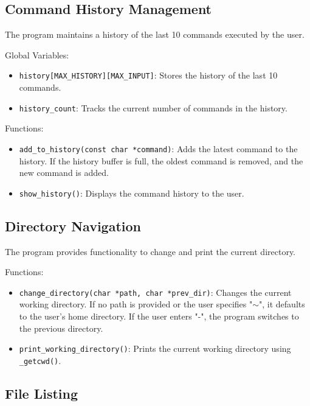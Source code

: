 \documentclass{article}
\begin{document}
\subsection{Command History Management}

The program maintains a history of the last 10 commands executed by the user.

Global Variables:

\begin{itemize}
\item \texttt{history[MAX\_HISTORY][MAX\_INPUT]}: Stores the history of the last 10 commands.
\item \texttt{history\_count}: Tracks the current number of commands in the history.
\end{itemize}

Functions:

\begin{itemize}
\item \texttt{add\_to\_history(const char *command)}: Adds the latest command to the history. If the history buffer is full, the oldest command is removed, and the new command is added.
\item \texttt{show\_history()}: Displays the command history to the user.
\end{itemize}

\subsection{Directory Navigation}

The program provides functionality to change and print the current directory.

Functions:

\begin{itemize}
\item \texttt{change\_directory(char *path, char *prev\_dir)}: Changes the current working directory. If no path is provided or the user specifies "$\sim$", it defaults to the user's home directory. If the user enters "-", the program switches to the previous directory.
\item \texttt{print\_working\_directory()}: Prints the current working directory using \texttt{\_getcwd()}.
\end{itemize}

\subsection{File Listing}
\end{document}
